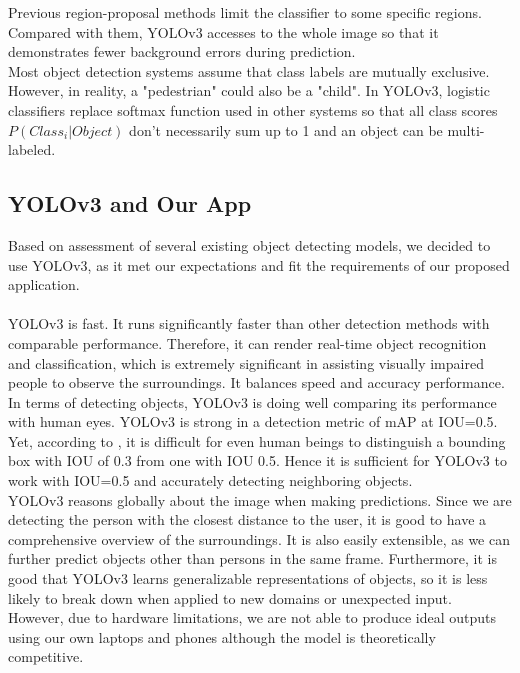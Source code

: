 \documentclass[letterpaper]{article} %
\begin{document}
\noindent Previous region-proposal methods limit the classifier to some specific regions. Compared with them, YOLOv3 accesses to the whole image so that it demonstrates fewer background errors during prediction.\\

\noindent Most object detection systems assume that class labels are mutually exclusive. However, in reality, a "pedestrian" could also be a "child". In YOLOv3, logistic classifiers replace softmax function used in other systems so that all class scores $P(Class_{i}|Object)$ don't necessarily sum up to 1 and an object can be multi-labeled\cite{YOLOdev}.

\subsection{YOLOv3 and Our App}
Based on assessment of several existing object detecting models, we decided to use YOLOv3, as it met our expectations and fit the requirements of our proposed application.\\
\\
\noindent YOLOv3 is fast. It runs significantly faster than other detection methods with comparable performance. Therefore, it can render real-time object recognition and classification, which is extremely significant in assisting visually impaired people to observe the surroundings. It balances speed and accuracy performance. In terms of detecting objects, YOLOv3 is doing well comparing its performance with human eyes. YOLOv3 is strong in a detection metric of mAP at IOU=0.5. Yet, according to \cite{Human-machine}, it is difficult for even human beings to distinguish a bounding box with IOU of 0.3 from one with IOU 0.5. Hence it is sufficient for YOLOv3 to work with IOU=0.5 and accurately detecting neighboring objects.\\

\noindent YOLOv3 reasons globally about the image when making predictions\cite{YOLOv3}. Since we are detecting the person with the closest distance to the user, it is good to have a comprehensive overview of the surroundings. It is also easily extensible, as we can further predict objects other than persons in the same frame. Furthermore, it is good that YOLOv3 learns generalizable representations of objects, so it is less likely to break down when applied to new domains or unexpected input. \cite{YOLOv3} However, due to hardware limitations, we are not able to produce ideal outputs using our own laptops and phones although the model is theoretically competitive.
\end{document}
